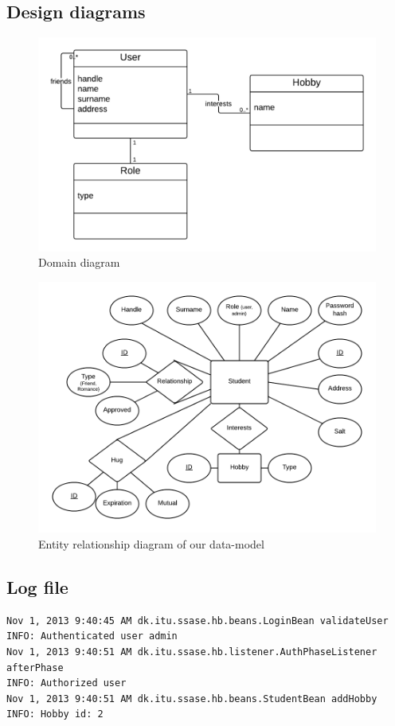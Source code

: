 \documentclass[a4paper]{article}
\begin{document}
\subsection{Design diagrams}
\begin{figure}[h!]
\centering
\includegraphics[scale=0.3]{Domain}
\caption{Domain diagram}
\label{fig:domain_diagram}
\end{figure}
\begin{figure}[h!]
\centering
\includegraphics[scale=0.4]{ER}
\caption{Entity relationship diagram of our data-model}
\label{fig:er_diagram}
\end{figure}

\newpage
\subsection{Log file}
\begin{verbatim}
Nov 1, 2013 9:40:45 AM dk.itu.ssase.hb.beans.LoginBean validateUser
INFO: Authenticated user admin
Nov 1, 2013 9:40:51 AM dk.itu.ssase.hb.listener.AuthPhaseListener afterPhase
INFO: Authorized user
Nov 1, 2013 9:40:51 AM dk.itu.ssase.hb.beans.StudentBean addHobby
INFO: Hobby id: 2
\end{verbatim}
\end{document}
